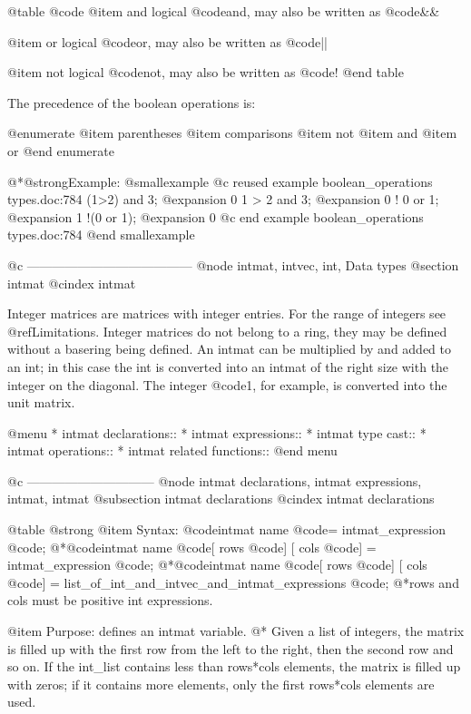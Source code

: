 {{@table @code
@item and
logical @code{and}, may also be written as @code{&&}

@item or
logical @code{or}, may also be written as @code{||}

@item not
logical @code{not}, may also be written as @code{!}
@end table

The precedence of the boolean operations is:

@enumerate
@item parentheses
@item comparisons
@item not
@item and
@item or
@end enumerate

@*@strong{Example:}
@smallexample
@c reused example boolean_operations types.doc:784 
  (1>2) and 3;
@expansion{} 0
  1 > 2 and 3;
@expansion{} 0
  ! 0 or 1;
@expansion{} 1
  !(0 or 1);
@expansion{} 0
@c end example boolean_operations types.doc:784
@end smallexample

@c ---------------------------------------
@node intmat, intvec, int, Data types
@section intmat
@cindex intmat

Integer matrices are matrices with integer entries. For the range of
integers see @ref{Limitations}. Integer matrices do not belong to a
ring, they may be defined without a basering being defined. An intmat
can be multiplied by and added to an int; in this case the int is
converted into an intmat of the right size with the integer on the
diagonal. The integer @code{1}, for example, is converted into the unit
matrix.

@menu
* intmat declarations::
* intmat expressions::
* intmat type cast::
* intmat operations::
* intmat related functions::
@end menu

@c ------------------------------
@node intmat declarations, intmat expressions, intmat, intmat
@subsection intmat declarations
@cindex intmat declarations

@table @strong
@item Syntax:
@code{intmat} name @code{=} intmat_expression @code{;}
@*@code{intmat} name @code{[} rows @code{] [} cols @code{] =} intmat_expression @code{;}
@*@code{intmat} name @code{[} rows @code{] [} cols @code{] =} list_of_int_and_intvec_and_intmat_expressions @code{;}
@*rows and cols must be positive int expressions.

@item Purpose:
defines an intmat variable.
@* Given a list of integers, the matrix is filled up with the first row
from the left to the right, then the second row and so on.
If the int_list contains less than rows*cols elements,
the matrix is filled up with zeros; if it contains more
elements, only the first rows*cols elements are used.

}}

